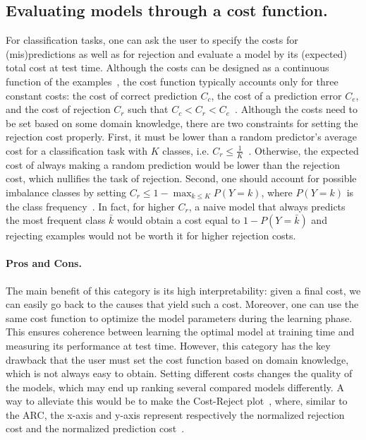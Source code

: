 \subsection{Evaluating models through a cost function.}
\label{sec:eval_arc}
For classification tasks, one can ask the user to specify the costs for (mis)predictions as well as for rejection and evaluate a model by its (expected) total cost at test time.
Although the costs can be designed as a continuous function of the examples~\citep{Mozannar2020,De2021}, the cost function typically accounts only for three constant costs: the cost of correct prediction $C_c$, the cost of a prediction error $C_e$, and the cost of rejection $C_r$ such that $C_c < C_r < C_e$~\citep{DeStefano2000,Balsubramani2016,Condessa2013}.  Although the costs need to be set based on some domain knowledge, there are two constraints for setting the rejection cost properly. First, it must be lower than a random predictor's average cost for a classification task with $K$ classes, i.e. $C_r \le \frac{1}{K}$~\citep{Cordella1995a,Herbei2006c}. Otherwise, the expected cost of always making a random prediction would be lower than the rejection cost, which nullifies the task of rejection. Second, one should account for possible imbalance classes by setting $C_r \le 1 - \max_{k \le K} P(Y = k)$, where $P(Y = k)$ is the class frequency~\citep{Perini2023}. In fact, for higher $C_r$, a naive model that always predicts the most frequent class $\bar{k}$ would obtain a cost equal to $1 - P(Y = \bar{k})$ and rejecting examples would not be worth it for higher rejection costs.

\paragraph{Pros and Cons.} The main benefit of this category is its high interpretability: given a final cost, we can easily go back to the causes that yield such a cost. Moreover, one can use the same cost function to optimize the model parameters during the learning phase. This ensures coherence between learning the optimal model at training time and measuring its performance at test time. However, this category has the key drawback that the user must set the cost function based on domain knowledge, which is not always easy to obtain. Setting different costs changes the quality of the models, which may end up ranking several compared models differently.
A way to alleviate this would be to make the Cost-Reject plot~\citep{Hanczar2019}, where, similar to the ARC, the x-axis and y-axis represent respectively the normalized rejection cost and the normalized prediction cost~\citep{Friedel2006,Abbas2019}.
